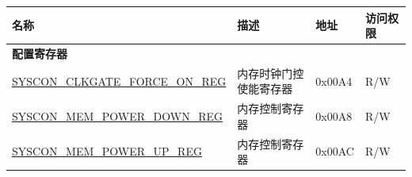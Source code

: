 \begin{longtable}{ | p{6.5cm} | p{5.5cm} | p{1.3cm} | p{2cm} |}
\hline\rowcolor{lightgray}
名称 & 描述 & 地址 & 访问权限 \\ \hline
\endhead
\multicolumn{4}{|l|}{\textbf{配置寄存器}} \\ \hline
\hyperref[regdesc:SYSCONCLKGATEFORCEONREG]{SYSCON\_CLKGATE\_FORCE\_ON\_REG} & 内存时钟门控使能寄存器 & 0x00A4 & R/W \\ \hline
\hyperref[regdesc:SYSCONMEMPOWERDOWNREG]{SYSCON\_MEM\_POWER\_DOWN\_REG} & 内存控制寄存器 & 0x00A8 & R/W \\ \hline
\hyperref[regdesc:SYSCONMEMPOWERUPREG]{SYSCON\_MEM\_POWER\_UP\_REG} & 内存控制寄存器 & 0x00AC & R/W \\ \hline
\end{longtable}
